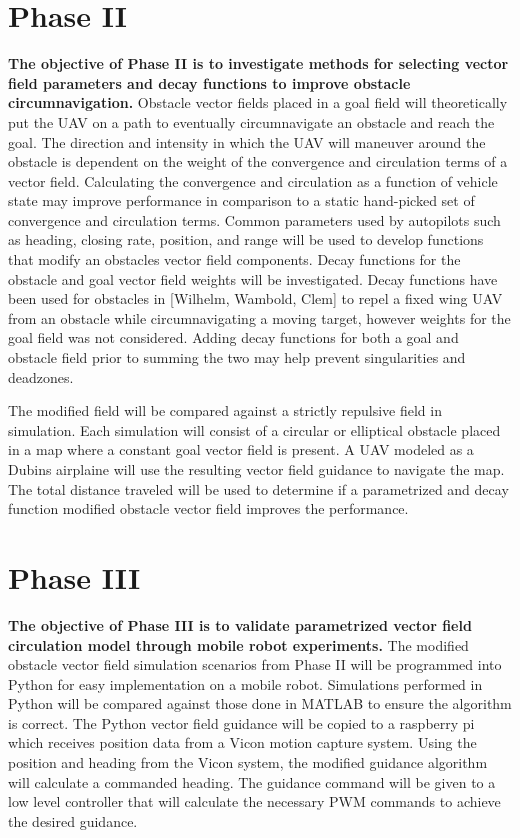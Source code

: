 \documentclass[numbered,pdftex]{ohio-etd}
\begin{document}
\section{Phase II}
\textbf{The objective of Phase II is to investigate methods for selecting vector field parameters and decay functions to improve obstacle circumnavigation.} Obstacle vector fields placed in a goal field will theoretically put the UAV on a path to eventually circumnavigate an obstacle and reach the goal. The direction and intensity in which the UAV will maneuver around the obstacle is dependent on the weight of the convergence and circulation terms of a vector field. Calculating the convergence and circulation as a function of vehicle state may improve performance in comparison to a static hand-picked set of convergence and circulation terms. Common parameters used by autopilots such as heading, closing rate, position, and range will be used to develop functions that modify an obstacles vector field components. Decay functions for the obstacle and goal vector field weights will be investigated. Decay functions have been used for obstacles in [Wilhelm, Wambold, Clem] to repel a fixed wing UAV from an obstacle while circumnavigating a moving target, however weights for the goal field was not considered. Adding decay functions for both a goal and obstacle field prior to summing the two may help prevent singularities and deadzones. 


The modified field will be compared against a strictly repulsive field in simulation. Each simulation will consist of a circular or elliptical obstacle placed in a map where a constant goal vector field is present. A UAV modeled as a Dubins airplaine will use the resulting vector field guidance to navigate the map. The total distance traveled will be used to determine if a parametrized and decay function modified obstacle vector field improves the performance.


\section{Phase III}
\textbf{The objective of Phase III is to validate parametrized vector field circulation model through mobile robot experiments.} The modified obstacle vector field simulation scenarios from Phase II will be programmed into Python for easy implementation on a mobile robot. Simulations performed in Python will be compared against those done in MATLAB to ensure the algorithm is correct. The Python vector field guidance will be copied to a raspberry pi which receives position data from a Vicon motion capture system. Using the position and heading from the Vicon system, the modified guidance algorithm will calculate a commanded heading. The guidance command will be given to a low level controller that will calculate the necessary PWM commands to achieve the desired guidance.
\end{document}
